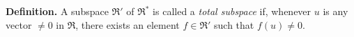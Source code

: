 \textbf{Definition.} A subspace $\mathfrak{R}'$ of $\mathfrak{R}^*$ is called a \textit{total subspace} if, whenever $u$ is any vector $\neq 0$ in $\mathfrak{R}$, there exists an element $f \in \mathfrak{R}'$ such that $f(u) \neq 0$.
